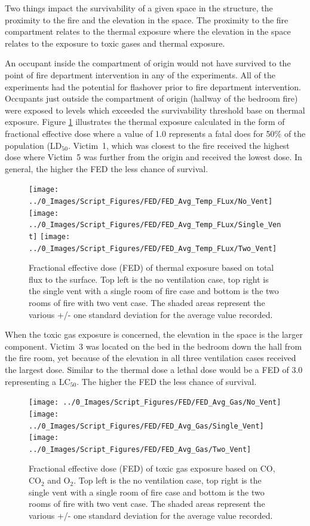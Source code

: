 \documentclass[12pt,oneside]{book}
\begin{document}
Two things impact the survivability of a given space in the structure, the proximity to the fire and the elevation in the space. The proximity to the fire compartment relates to the thermal exposure where the elevation in the space relates to the exposure to toxic gases and thermal exposure. 

An occupant inside the compartment of origin would not have survived to the point of fire department intervention in any of the experiments. All of the experiments had the potential for flashover prior to fire department intervention. Occupants just outside the compartment of origin (hallway of the bedroom fire) were exposed to levels which exceeded the survivability threshold base on thermal exposure. Figure \ref{fig:FED_heat_TC} illustrates the thermal exposure calculated in the form of fractional effective dose where a value of 1.0 represents a fatal does for 50\% of the population (LD$_{50}$. Victim~1, which was closest to the fire received the highest dose where Victim~5 was further from the origin and received the lowest dose. In general, the higher the FED the less chance of survival. 

\begin{figure}[H]
\centering
\texttt{[image: ../0\_Images/Script\_Figures/FED/FED\_Avg\_Temp\_FLux/No\_Vent]}
\texttt{[image: ../0\_Images/Script\_Figures/FED/FED\_Avg\_Temp\_FLux/Single\_Vent]}
\texttt{[image: ../0\_Images/Script\_Figures/FED/FED\_Avg\_Temp\_FLux/Two\_Vent]}
\caption[Thermal Exposure Total Flux - Three Ventilation Configurations]{Fractional effective dose (FED) of thermal exposure based on total flux to the surface. Top left is the no ventilation case, top right is the single vent with a single room of fire case and bottom is the two rooms of fire with two vent case. The shaded areas represent the various +/- one standard deviation for the average value recorded.}
\label{fig:FED_heat_TC}
\end{figure}

When the toxic gas exposure is concerned, the elevation in the space is the larger component. Victim~3 was located on the bed in the bedroom down the hall from the fire room, yet because of the elevation in all three ventilation cases received the largest dose. Similar to the thermal dose a lethal dose would be a FED of 3.0 representing a LC$_{50}$. The higher the FED the less chance of survival. 

\begin{figure}[H]
\centering
\texttt{[image: ../0\_Images/Script\_Figures/FED/FED\_Avg\_Gas/No\_Vent]}
\texttt{[image: ../0\_Images/Script\_Figures/FED/FED\_Avg\_Gas/Single\_Vent]}
\texttt{[image: ../0\_Images/Script\_Figures/FED/FED\_Avg\_Gas/Two\_Vent]}
\caption[Toxic Gas Exposure - Three Ventilation Configurations]{Fractional effective dose (FED) of toxic gas exposure based on CO, CO$_2$ and O$_2$. Top left is the no ventilation case, top right is the single vent with a single room of fire case and bottom is the two rooms of fire with two vent case. The shaded areas represent the various +/- one standard deviation for the average value recorded.}
\label{fig:FED_gas_TC}
\end{figure}
\end{document}
